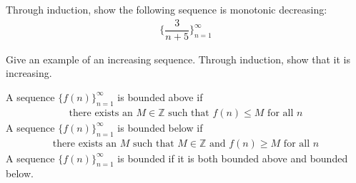 \begin{exercise}
Through induction, show the following sequence is monotonic decreasing:
\begin{align*}
    \Big\{\dfrac{3}{n+5}\Big\}_{n=1}^{\infty}
\end{align*}
\end{exercise}

\begin{exercise}
Give an example of an increasing sequence. Through induction, show that it is increasing.
\end{exercise}

\begin{definition}
A sequence $\{f(n)\}_{n=1}^{\infty}$ is bounded above if
\begin{align*}
    \text{there exists an} \hspace{4pt} M \in \mathbb{Z} \hspace{4pt} \text{such that} \hspace{4pt} f(n) \leq M \hspace{4pt} \text{for all} \hspace{4pt} n
\end{align*}
A sequence $\{f(n)\}_{n=1}^{\infty}$ is bounded below if
\begin{align*}
    \text{there exists an} \hspace{4pt} M \hspace{4pt} \text{such that} \hspace{4pt} M \in \mathbb{Z} \hspace{4pt} \text{and} \hspace{4pt} f(n) \geq M \hspace{4pt} \text{for all} \hspace{4pt} n
\end{align*}
A sequence $\{f(n)\}_{n=1}^{\infty}$ is bounded if it is both bounded above and bounded below.
\end{definition}

